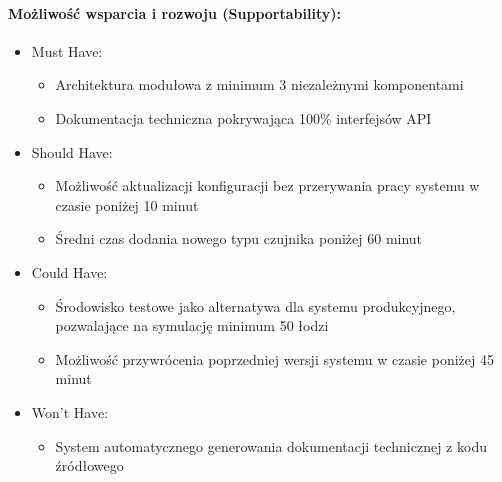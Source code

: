 \documentclass[12pt,a4paper,polish]{article}
\begin{document}
\paragraph{Możliwość wsparcia i rozwoju (Supportability):}
\begin{itemize}
	\item Must Have:
	      \begin{itemize}
		      \item Architektura modułowa z minimum 3 niezależnymi komponentami
		      \item Dokumentacja techniczna pokrywająca 100\% interfejsów API
	      \end{itemize}
	\item Should Have:
	      \begin{itemize}
		      \item Możliwość aktualizacji konfiguracji bez przerywania pracy systemu w czasie poniżej 10 minut
		      \item Średni czas dodania nowego typu czujnika poniżej 60 minut
	      \end{itemize}
	\item Could Have:
	      \begin{itemize}
		      \item Środowisko testowe jako alternatywa dla systemu produkcyjnego, pozwalające na symulację minimum 50 łodzi
		      \item Możliwość przywrócenia poprzedniej wersji systemu w czasie poniżej 45 minut
	      \end{itemize}
	\item Won't Have:
	      \begin{itemize}
		      \item System automatycznego generowania dokumentacji technicznej z kodu źródłowego
	      \end{itemize}
\end{itemize}
\end{document}
